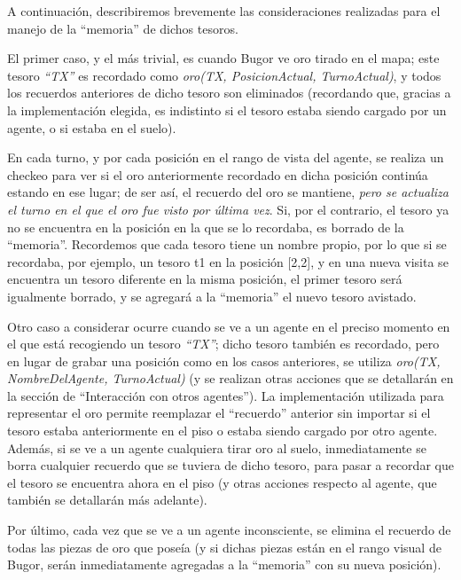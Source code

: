 \documentclass[a4paper,10pt,spanish]{article}
\begin{document}
		A continuaci\'on, describiremos brevemente las consideraciones realizadas para el manejo de la ``memoria'' de dichos tesoros.
		
		El primer caso, y el m\'as trivial, es cuando Bugor ve oro tirado en el mapa; este tesoro \emph{``TX''} es recordado como \emph{oro(TX, PosicionActual, TurnoActual)}, y todos los recuerdos anteriores de dicho tesoro son eliminados (recordando que, gracias a la implementaci\'on elegida, es indistinto si el tesoro estaba siendo cargado por un agente, o si estaba en el suelo).
		
		En cada turno, y por cada posici\'on en el rango de vista del agente, se realiza un checkeo para ver si el oro anteriormente recordado en dicha posici\'on contin\'ua estando en ese lugar; de ser as\'i, el recuerdo del oro se mantiene, \emph{pero se actualiza el turno en el que el oro fue visto por \'ultima vez}. Si, por el contrario, el tesoro ya no se encuentra en la posici\'on en la que se lo recordaba, es borrado de la ``memoria''. Recordemos que cada tesoro tiene un nombre propio, por lo que si se recordaba, por ejemplo, un tesoro t1 en la posici\'on [2,2], y en una nueva visita se encuentra un tesoro diferente en la misma posici\'on, el primer tesoro ser\'a igualmente borrado, y se agregar\'a a la ``memoria'' el nuevo tesoro avistado.
		
		Otro caso a considerar ocurre cuando se ve a un agente en el preciso momento en el que est\'a recogiendo un tesoro \emph{``TX''}; dicho tesoro tambi\'en es recordado, pero en lugar de grabar una posici\'on como en los casos anteriores, se utiliza \emph{oro(TX, NombreDelAgente, TurnoActual)} (y se realizan otras acciones que se detallar\'an en la secci\'on de ``Interacci\'on con otros agentes''). La implementaci\'on utilizada para representar el oro permite reemplazar el ``recuerdo'' anterior sin importar si el tesoro estaba anteriormente en el piso o estaba siendo cargado por otro agente. Adem\'as, si se ve a un agente cualquiera tirar oro al suelo, inmediatamente se borra cualquier recuerdo que se tuviera de dicho tesoro, para pasar a recordar que el tesoro se encuentra ahora en el piso (y otras acciones respecto al agente, que tambi\'en se detallar\'an m\'as adelante).
		
		Por \'ultimo, cada vez que se ve a un agente inconsciente, se elimina el recuerdo de todas las piezas de oro que pose\'ia (y si dichas piezas est\'an en el rango visual de Bugor, ser\'an inmediatamente agregadas a la ``memoria'' con su nueva posici\'on).
		
\end{document}
